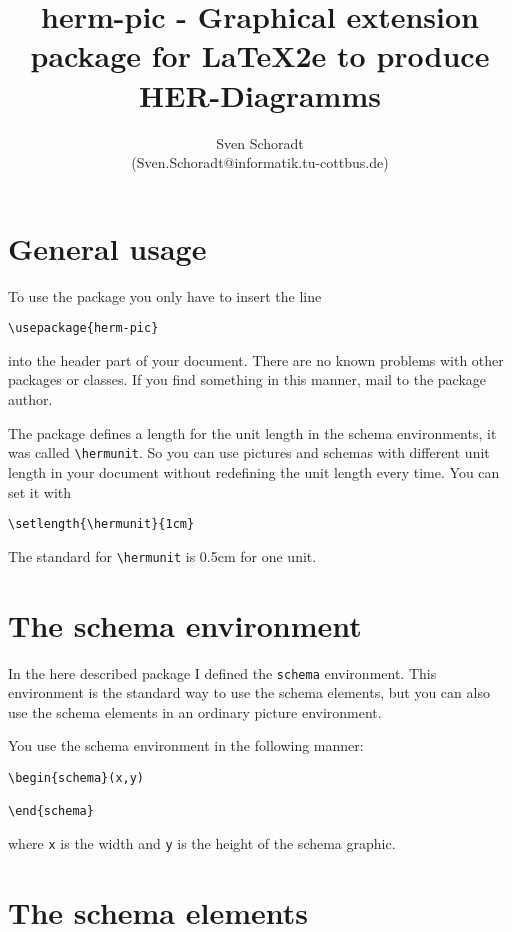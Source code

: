 \documentclass[a4paper,11pt]{article}
\author{Sven Schoradt \\ (Sven.Schoradt@informatik.tu-cottbus.de)}
\title{herm-pic - Graphical extension package for LaTeX2e to produce HER-Diagramms}
\begin{document}
\maketitle

\section{General usage}

To use the package you only have to insert the line

\begin{verbatim}
\usepackage{herm-pic}
\end{verbatim}

into the header part of your document. There are no known problems with other
packages or classes. If you find something in this manner, mail to the package author.

The package defines a length for the unit length in the schema environments, it was called
\verb|\hermunit|. So you can use pictures and schemas with different unit length in your 
document without redefining the unit length every time. You can set it with
\begin{verbatim}
\setlength{\hermunit}{1cm}
\end{verbatim}
The standard for \verb|\hermunit| is 0.5cm for one unit.

\section{The schema environment}

In the here described package I defined the {\tt schema} environment.
This environment is the standard way to use the schema elements, but you 
can also use the schema elements in an ordinary picture environment.

You use the schema environment in the following manner:

\begin{verbatim}
\begin{schema}(x,y)

\end{schema}
\end{verbatim}

where {\tt x} is the width and {\tt y} is the height of 
the schema graphic.

\section{The schema elements}
\end{document}
